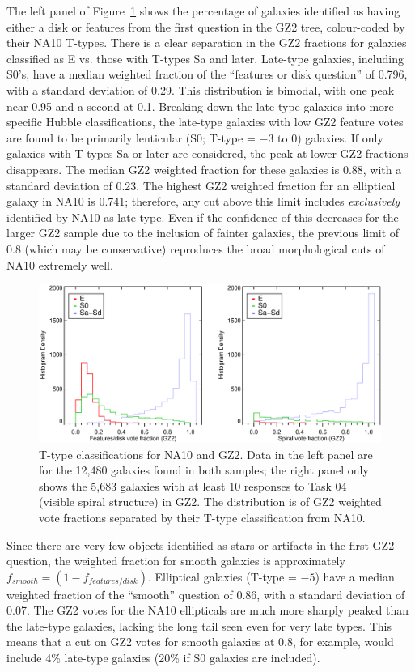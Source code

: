 \documentclass[useAMS,usenatbib]{mn2e}
\begin{document}
The left panel of Figure~\ref{fig-na_ttype} shows the percentage of galaxies identified as having either a disk or features from the first question in the GZ2 tree, colour-coded by their NA10 T-types. There is a clear separation in the GZ2 fractions for galaxies classified as E vs. those with T-types Sa and later. Late-type galaxies, including S0's, have a median weighted fraction of the ``features or disk question'' of 0.796, with a standard deviation of 0.29. This distribution is bimodal, with one peak near 0.95 and a second at 0.1. Breaking down the late-type galaxies into more specific Hubble classifications, the late-type galaxies with low GZ2 feature votes are found to be primarily lenticular (S0; T-type = $-3$ to 0) galaxies. If only galaxies with T-types Sa or later are considered, the peak at lower GZ2 fractions disappears. The median GZ2 weighted fraction for these galaxies is 0.88, with a standard deviation of 0.23. The highest GZ2 weighted fraction for an elliptical galaxy in NA10 is 0.741; therefore, any cut above this limit includes {\it exclusively} identified by NA10 as late-type. Even if the confidence of this decreases for the larger GZ2 sample due to the inclusion of fainter galaxies, the previous limit of 0.8 (which may be conservative) reproduces the broad morphological cuts of NA10 extremely well. 

\begin{figure}
\includegraphics[angle=0,width=7.0in]{figures/na_ttype.eps}
\caption{T-type classifications for NA10 and GZ2. Data in the left panel are for the 12,480 galaxies found in both samples; the right panel only shows the 5,683 galaxies with at least 10 responses to Task 04 (visible spiral structure) in GZ2. The distribution is of GZ2 weighted vote fractions separated by their T-type classification from NA10. 
\label{fig-na_ttype}}
\end{figure}

Since there are very few objects identified as stars or artifacts in the first GZ2 question, the weighted fraction for smooth galaxies is approximately $f_{smooth} = (1 - f_{features/disk})$. Elliptical galaxies (T-type = $-5$) have a median weighted fraction of the ``smooth'' question of 0.86, with a standard deviation of 0.07. The GZ2 votes for the NA10 ellipticals are much more sharply peaked than the late-type galaxies, lacking the long tail seen even for very late types. This means that a cut on GZ2 votes for smooth galaxies at 0.8, for example, would include 4\% late-type galaxies (20\% if S0 galaxies are included). 
\end{document}
